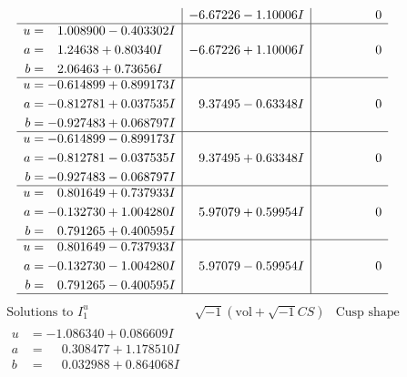 \documentclass[1p]{elsarticle_modified}
\theoremstyle{definition}
\newcommand{\I}{\sqrt{-1}}
\begin{document}
$$\begin{array}{c|c|c}
 & -6.67226 - 1.10006 I & \phantom{-0.000000 } 0 \\ \hline\begin{aligned}
u &= \phantom{-}1.008900 - 0.403302 I \\
a &= \phantom{-}1.24638 + 0.80340 I \\
b &= \phantom{-}2.06463 + 0.73656 I\end{aligned}
 & -6.67226 + 1.10006 I & \phantom{-0.000000 } 0 \\ \hline\begin{aligned}
u &= -0.614899 + 0.899173 I \\
a &= -0.812781 + 0.037535 I \\
b &= -0.927483 + 0.068797 I\end{aligned}
 & \phantom{-}9.37495 - 0.63348 I & \phantom{-0.000000 } 0 \\ \hline\begin{aligned}
u &= -0.614899 - 0.899173 I \\
a &= -0.812781 - 0.037535 I \\
b &= -0.927483 - 0.068797 I\end{aligned}
 & \phantom{-}9.37495 + 0.63348 I & \phantom{-0.000000 } 0 \\ \hline\begin{aligned}
u &= \phantom{-}0.801649 + 0.737933 I \\
a &= -0.132730 + 1.004280 I \\
b &= \phantom{-}0.791265 + 0.400595 I\end{aligned}
 & \phantom{-}5.97079 + 0.59954 I & \phantom{-0.000000 } 0 \\ \hline\begin{aligned}
u &= \phantom{-}0.801649 - 0.737933 I \\
a &= -0.132730 - 1.004280 I \\
b &= \phantom{-}0.791265 - 0.400595 I\end{aligned}
 & \phantom{-}5.97079 - 0.59954 I & \phantom{-0.000000 } 0\\
 \hline 
 \end{array}$$\newpage$$\begin{array}{c|c|c}  
\text{Solutions to }I^u_{1}& \I (\text{vol} + \sqrt{-1}CS) & \text{Cusp shape}\\
 \hline 
\begin{aligned}
u &= -1.086340 + 0.086609 I \\
a &= \phantom{-}0.308477 + 1.178510 I \\
b &= \phantom{-}0.032988 + 0.864068 I\end{aligned}

\end{array}$$
\end{document}
